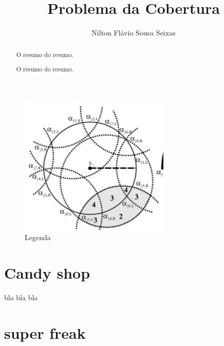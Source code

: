 \documentclass[12pt,twocolumn]{article}
\title{Problema da Cobertura}
\author{Nilton Flávio Sousa Seixas}
\begin{document}
\maketitle{}
\tableofcontents
\begin{abstract}
O resumo do resumo.
\end{abstract}
\begin{abstract}
O resumo do resumo.
\end{abstract}
\begin{figure}[!thb]
\centering
\includegraphics[scale=0.5]{teste.jpg}
\caption{Legenda}
\label{Rotulo}
\end{figure}
\section{Candy shop}
bla bla bla
\section {super freak}



	
\end{document}
